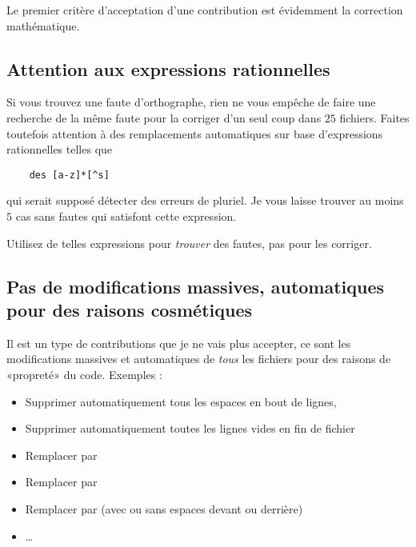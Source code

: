 Le premier critère d'acceptation d'une contribution est évidemment la correction mathématique.

\subsection{Attention aux expressions rationnelles}

Si vous trouvez une faute d'orthographe, rien ne vous empêche de faire une recherche de la même faute pour la corriger d'un seul coup dans \( 25\) fichiers. Faites toutefois attention à des remplacements automatiques sur base d'expressions rationnelles telles que
\begin{verbatim}
    des [a-z]*[^s]
\end{verbatim}
qui serait supposé détecter des erreurs de pluriel. Je vous laisse trouver au moins \( 5\) cas sans fautes qui satisfont cette expression.

Utilisez de telles expressions pour \emph{trouver} des fautes, pas pour les corriger.

\subsection{Pas de modifications massives, automatiques pour des raisons cosmétiques}

Il est un type de contributions que je ne vais plus accepter, ce sont les modifications massives et automatiques de \emph{tous} les fichiers pour des raisons de «propreté» du code. Exemples : 
\begin{itemize}
    \item Supprimer automatiquement tous les espaces en bout de lignes,
    \item Supprimer automatiquement toutes les lignes vides en fin de fichier
    \item Remplacer  par 
    \item Remplacer \info{\textbackslash [} par 
    \item Remplacer  par  (avec ou sans espaces devant ou derrière)
    \item \ldots
\end{itemize}

